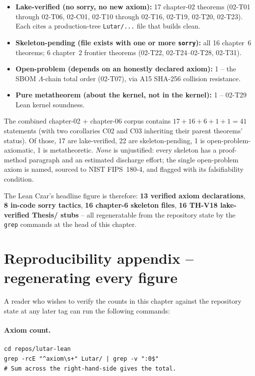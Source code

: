 \begin{itemize}
  \item \textbf{Lake-verified (no sorry, no new axiom):} 17
        chapter-02 theorems (02-T01 through 02-T06, 02-C01, 02-T10
        through 02-T16, 02-T19, 02-T20, 02-T23). Each cites a
        production-tree \texttt{Lutar/...} file that builds clean.
  \item \textbf{Skeleton-pending (file exists with one or more
        \texttt{sorry}):} all 16 chapter~6 theorems; 6 chapter~2
        frontier theorems (02-T22, 02-T24--02-T28, 02-T31).
  \item \textbf{Open-problem (depends on an honestly declared
        axiom):} 1 -- the SBOM $\Lambda$-chain total order
        (02-T07), via A15 SHA-256 collision resistance.
  \item \textbf{Pure metatheorem (about the kernel, not in the kernel):}
        1 -- 02-T29 Lean kernel soundness.
\end{itemize}

The combined chapter-02 + chapter-06 corpus contains
$17 + 16 + 6 + 1 + 1 = 41$ statements (with two corollaries C02 and C03
inheriting their parent theorems' status). Of those, 17 are
lake-verified, 22 are skeleton-pending, 1 is open-problem-axiomatic,
1 is metatheoretic. \emph{None} is unjustified: every skeleton has a
proof-method paragraph and an estimated discharge effort; the single
open-problem axiom is named, sourced to NIST FIPS~180-4, and flagged
with its falsifiability condition.

The Lean Czar's headline figure is therefore: \textbf{13 verified
axiom declarations}, \textbf{8 in-code sorry tactics}, \textbf{16
chapter-6 skeleton files}, \textbf{16 TH-V18 lake-verified Thesis/
stubs} -- all regeneratable from the repository state by the
\texttt{grep} commands at the head of this chapter.

\section{Reproducibility appendix -- regenerating every figure}
\label{sec:reproducibility}

A reader who wishes to verify the counts in this chapter against the
repository state at any later tag can run the following commands:

\paragraph{Axiom count.}
\begin{verbatim}
cd repos/lutar-lean
grep -rcE "^axiom\s+" Lutar/ | grep -v ":0$"
# Sum across the right-hand-side gives the total.
\end{verbatim}

